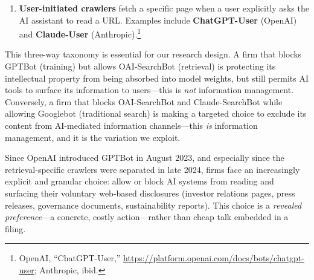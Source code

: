 \documentclass[12pt,a4paper]{article}
\begin{document}
\begin{enumerate}[label=(\alph*)]
    \item \textbf{User-initiated crawlers} fetch a specific page when a user explicitly asks the AI assistant to read a URL. Examples include \textbf{ChatGPT-User} (OpenAI) and \textbf{Claude-User} (Anthropic).\footnote{OpenAI, ``ChatGPT-User,'' \url{https://platform.openai.com/docs/bots/chatgpt-user}; Anthropic, ibid.}
\end{enumerate}

\noindent This three-way taxonomy is essential for our research design. A firm that blocks GPTBot (training) but allows OAI-SearchBot (retrieval) is protecting its intellectual property from being absorbed into model weights, but still permits AI tools to surface its information to users---this is \emph{not} information management. Conversely, a firm that blocks OAI-SearchBot and Claude-SearchBot while allowing Googlebot (traditional search) is making a targeted choice to exclude its content from AI-mediated information channels---this \emph{is} information management, and it is the variation we exploit.

Since OpenAI introduced GPTBot in August 2023, and especially since the retrieval-specific crawlers were separated in late 2024, firms face an increasingly explicit and granular choice: allow or block AI systems from reading and surfacing their voluntary web-based disclosures (investor relations pages, press releases, governance documents, sustainability reports). This choice is a \emph{revealed preference}---a concrete, costly action---rather than cheap talk embedded in a filing.
\end{document}
